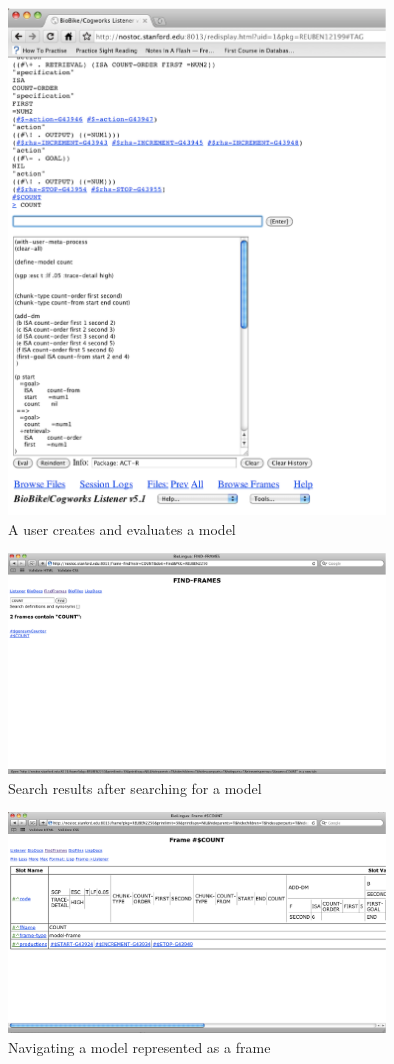 \begin{figure}[htp]
  \centering
  \includegraphics[width=100mm]{UserCreatesModel}
  \caption{A user creates and evaluates a model}
  \label{UserCreatesModel}
\end{figure}

\begin{figure}[htp]
  \centering
  \includegraphics[width=100mm]{SearchForModel}
  \caption{Search results after searching for a model}
  \label{SearchForModel}
\end{figure}

\begin{figure}[htp]
  \centering
  \includegraphics[width=100mm]{NavigateFrame}
  \caption{Navigating a model represented as a frame}
  \label{NavigateFrame}
\end{figure}

